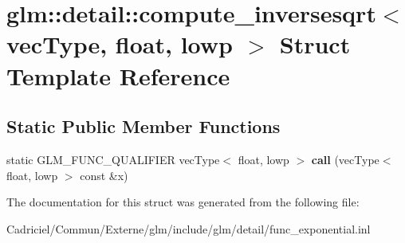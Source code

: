 \hypertarget{structglm_1_1detail_1_1compute__inversesqrt_3_01vec_type_00_01float_00_01lowp_01_4}{}\section{glm\+:\+:detail\+:\+:compute\+\_\+inversesqrt$<$ vec\+Type, float, lowp $>$ Struct Template Reference}
\label{structglm_1_1detail_1_1compute__inversesqrt_3_01vec_type_00_01float_00_01lowp_01_4}
\subsection*{Static Public Member Functions}
\begin{DoxyCompactItemize}
\item 
static G\+L\+M\+\_\+\+F\+U\+N\+C\+\_\+\+Q\+U\+A\+L\+I\+F\+I\+ER vec\+Type$<$ float, lowp $>$ {\bfseries call} (vec\+Type$<$ float, lowp $>$ const \&x)\hypertarget{structglm_1_1detail_1_1compute__inversesqrt_3_01vec_type_00_01float_00_01lowp_01_4_a943fd9690f6c1fcb7383bfbcde30c3fb}{}\label{structglm_1_1detail_1_1compute__inversesqrt_3_01vec_type_00_01float_00_01lowp_01_4_a943fd9690f6c1fcb7383bfbcde30c3fb}

\end{DoxyCompactItemize}


The documentation for this struct was generated from the following file\+:\begin{DoxyCompactItemize}
\item 
Cadriciel/\+Commun/\+Externe/glm/include/glm/detail/func\+\_\+exponential.\+inl\end{DoxyCompactItemize}
